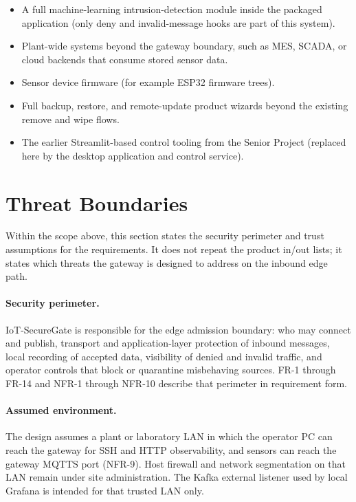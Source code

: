 \documentclass[12pt,a4paper]{report}
\begin{document}
\begin{itemize}
    \item A full machine-learning intrusion-detection
    module inside the packaged application (only deny and
    invalid-message hooks are part of this system).
    \item Plant-wide systems beyond the gateway boundary,
    such as MES, SCADA, or cloud backends that consume
    stored sensor data.
    \item Sensor device firmware (for example ESP32
    firmware trees).
    \item Full backup, restore, and remote-update product
    wizards beyond the existing remove and wipe flows.
    \item The earlier Streamlit-based control tooling from
    the Senior Project (replaced here by the desktop
    application and control service).
\end{itemize}

\section{Threat Boundaries}
\label{sec:threat-boundaries}

Within the scope above, this section states the security
perimeter and trust assumptions for the requirements.
It does not repeat the product in/out lists; it states
which threats the gateway is designed to address on the
inbound edge path.

\paragraph{Security perimeter.}
IoT-SecureGate is responsible for the edge admission
boundary: who may connect and publish, transport and
application-layer protection of inbound messages,
local recording of accepted data, visibility of denied
and invalid traffic, and operator controls that block
or quarantine misbehaving sources. FR-1 through FR-14
and NFR-1 through NFR-10 describe that perimeter in
requirement form.

\paragraph{Assumed environment.}
The design assumes a plant or laboratory LAN in which
the operator PC can reach the gateway for SSH and HTTP
observability, and sensors can reach the gateway MQTTS
port (NFR-9). Host firewall and network segmentation on
that LAN remain under site administration. The Kafka
external listener used by local Grafana is intended for
that trusted LAN only.
\end{document}
